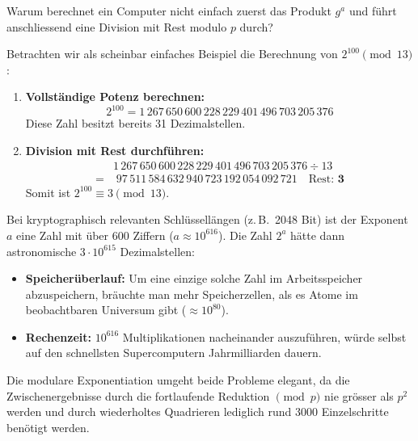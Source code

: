 \begin{myremark}\label{rem:modular-exp-naive}
	Warum berechnet ein Computer nicht einfach zuerst das Produkt $g^a$ und führt anschliessend eine Division mit Rest modulo $p$ durch?

	Betrachten wir als scheinbar einfaches Beispiel die Berechnung von $2^{100} \pmod{13}$:
	\begin{enumerate}
		\item \textbf{Vollständige Potenz berechnen:}
		      \[
			      2^{100} = 1\,267\,650\,600\,228\,229\,401\,496\,703\,205\,376
		      \]
		      Diese Zahl besitzt bereits 31 Dezimalstellen.
		\item \textbf{Division mit Rest durchführen:}
		      \begin{align*}
			        & 1\,267\,650\,600\,228\,229\,401\,496\,703\,205\,376 \div 13 \\
			      = & \; 97\,511\,584\,632\,940\,723\,192\,054\,092\,721 \quad\text{Rest: } \mathbf{3}
		      \end{align*}
		      Somit ist $2^{100} \equiv 3 \pmod{13}$.
	\end{enumerate}
	Bei kryptographisch relevanten Schlüssellängen (z.\,B.\ 2048 Bit) ist der Exponent $a$ eine Zahl mit über 600 Ziffern ($a \approx 10^{616}$). Die Zahl $2^a$ hätte dann astronomische $3 \cdot 10^{615}$ Dezimalstellen:
	\begin{itemize}
		\item \textbf{Speicherüberlauf:} Um eine einzige solche Zahl im Arbeitsspeicher abzuspeichern, bräuchte man mehr Speicherzellen, als es Atome im beobachtbaren Universum gibt ($\approx 10^{80}$).
		\item \textbf{Rechenzeit:} $10^{616}$ Multiplikationen nacheinander auszuführen, würde selbst auf den schnellsten Supercomputern Jahrmilliarden dauern.
	\end{itemize}
	Die modulare Exponentiation umgeht beide Probleme elegant, da die Zwischenergebnisse durch die fortlaufende Reduktion $\pmod p$ nie grösser als $p^2$ werden und durch wiederholtes Quadrieren lediglich rund 3000 Einzelschritte benötigt werden.
\end{myremark}

